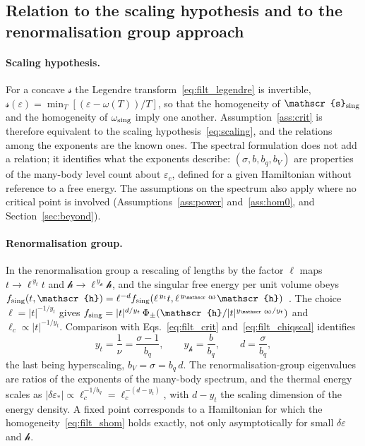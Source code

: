 \documentclass[10pt,a4paper]{article}
\theoremstyle{plain}
\newcommand{\hfield}{\mathscr{h}}  %
\newcommand{\lds}{\mathscr{s}}  %
\begin{document}
\subsection{Relation to the scaling hypothesis and to the renormalisation group approach}
\label{sec:filt_rg}

\paragraph{Scaling hypothesis.} For a concave $\lds$ the Legendre
transform~\eqref{eq:filt_legendre} is invertible,
$\lds(\varepsilon)=\min_T[(\varepsilon-\omega(T))/T]$, so that the
homogeneity of $\lds_{\rm sing}$ and the homogeneity of $\omega_{\rm sing}$
imply one another. Assumption~\ref{ass:crit} is therefore equivalent to the
scaling hypothesis~\eqref{eq:scaling}, and the relations among the exponents
are the known ones. The spectral formulation does not add a relation; it
identifies what the exponents describe: $(\sigma,b,b_q,b_V)$ are properties
of the many-body level count about $\varepsilon_c$, defined for a given
Hamiltonian without reference to a free energy. The assumptions on the
spectrum also apply where no critical point is involved
(Assumptions~\ref{ass:power} and~\ref{ass:hom0}, and
Section~\ref{sec:beyond}).

\paragraph{Renormalisation group.} In the renormalisation group a rescaling
of lengths by the factor $\ell$ maps $t\to\ell^{\,y_t}t$ and
$\hfield\to\ell^{\,y_\hfield}\hfield$, and the singular free energy per unit
volume obeys
$f_{\rm sing}(t,\hfield)=\ell^{-d}f_{\rm sing}(\ell^{\,y_t}t,\ell^{\,y_\hfield}\hfield)$~\cite[Ch.~7]{Plischke}.
The choice $\ell=|t|^{-1/y_t}$ gives
$f_{\rm sing}=|t|^{d/y_t}\,\Phi_\pm(\hfield/|t|^{y_\hfield/y_t})$ and
$\ell_c\propto|t|^{-1/y_t}$. Comparison with Eqs.~\eqref{eq:filt_crit}
and~\eqref{eq:filt_chiqscal} identifies
\[
  y_t=\frac1\nu=\frac{\sigma-1}{b_q} ,\qquad
  y_\hfield=\frac{b}{b_q} ,\qquad
  d=\frac{\sigma}{b_q} ,
\]
the last being hyperscaling, $b_V=\sigma=b_q \, d$. The
renormalisation-group eigenvalues are ratios of the exponents of the
many-body spectrum, and the thermal energy scales as
$|\delta\varepsilon_*|\propto\ell_c^{-1/b_q}=\ell_c^{-(d-y_t)}$, with $d-y_t$
the scaling dimension of the energy density. A fixed point corresponds to a
Hamiltonian for which the homogeneity~\eqref{eq:filt_shom} holds exactly,
not only asymptotically for small $\delta\varepsilon$ and $\hfield$.
\end{document}
